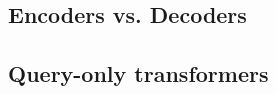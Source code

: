


\subsection {Encoders vs. Decoders}
\label{ss:enc-vs-dec}

\subsection{Query-only transformers}
\label{ss:pure-query}









